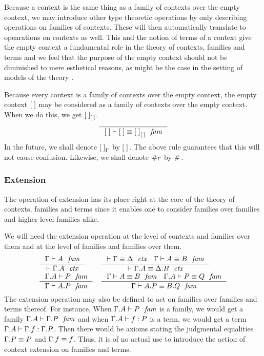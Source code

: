 Because a context is the same thing as a family of contexts over the empty
context, we may introduce other type theoretic operations by only describing
operations on families of contexts. These will then automatically translate
to opearations on contexts as well. This and the notion of terms of a context
give the empty context a fundamental role in the theory of contexts, families
and terms and we feel that the purpose of the empty context should not be
diminished to mere esthetical reasons, as might be the case in the setting
of models of the theory \cite{Awodey2013}.

\label{comp-00}
Because every context is a family of contexts over the empty context, 
the empty context $\emptyc$ may be considered as a family of contexts over the empty
context. When we do this, we get $\emptyf[\emptyc]$.
\begin{equation}\label{eq:comp-00}
\inference
  { }
  { \jfameq
      {\emptyc}
      {\emptyc}
      {\emptyf[\emptyc]}
    }
\end{equation}
In the future, we shall denote $\emptyf[\Gamma]$ by $\emptyf$. The above rule
guarantees that this will not cause confusion. Likewise, we shall denote
$\emptytm[\Gamma]$ by $\emptytm$.

\subsubsection{Extension}
\label{extension}
The operation of extension has its place right at the core of the theory of
contexts, families and terms since it enables one to consider families over
families and higher level families alike.

We will need the extension operation at the level of contexts and families 
over them and at the level of families and families over them. 
\begin{align}
& \inference
  { \jfam{\Gamma}{A}
    }
  { \jctx{\ctxext{\Gamma}{A}}
    }
& & \inference
    { \jctxeq{\Gamma}{\Delta}
      \jfameq{\Gamma}{A}{B}
      }
    { \jctxeq{\ctxext{\Gamma}{A}}{\ctxext{\Delta}{B}}
      }
    \\
& \inference
  { \jfam{{\Gamma}{A}}{P}
    }
  { \jfam{\Gamma}{\ctxext{A}{P}}
    }
& & \inference
    { \jfameq{\Gamma}{A}{B} 
      \jfameq{{\Gamma}{A}}{P}{Q}
      }
    { \jfameq{\Gamma}{\ctxext{A}{P}}{\ctxext{B}{Q}}
      }
\end{align}
The extension operation may also be defined to act on families over families
and terms thereof. For instance, When $\jfam{{\Gamma}{A}}{P}$ is a family,
we would get a family $\jfam{{\Gamma}{A}}{{\Gamma}{P}}$ and when
$\jterm{{\Gamma}{A}}{P}{f}$ is a term, we would get a term
$\jterm{{\Gamma}{A}}{{\Gamma}{P}}{\ctxext{\Gamma}{f}}$. Then there would be
axioms stating the judgmental equalities $\ctxext{\Gamma}{P}\jdeq P$ and
$\ctxext{\Gamma}{f}\jdeq f$. Thus, it is of no actual use to introduce the
action of context extension on families and terms.

